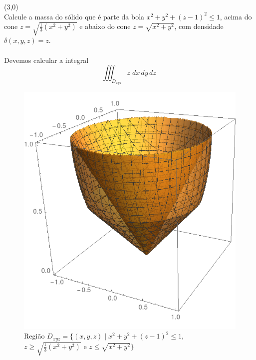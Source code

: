 \documentclass[12pt,a4paper]{article}
\begin{document}
\newpage

 (3,0) \\

Calcule a massa do sólido que é parte da bola $ x^2 + y^2 + (z-1)^2 \leq 1 $, acima do cone $ z = \displaystyle\sqrt{\frac{1}{3}(x^2 + y^2)}$ e abaixo do cone $z = \sqrt{x^2 + y^2}$, com densidade $\delta(x,y,z) = z$. \\

\\

Devemos calcular a integral
\begin{equation}
 \iiint_{D_{xyz}} z \;dx\,dy\,dz \
\label{eq:integralB}
\end{equation}

\begin{figure}[H]
	\centering
	\includegraphics[scale=0.3]{Fig3B.png}  
	\caption{Regi\~{a}o $ D_{xyz} = \lbrace(x, y, z)\mid x^2 + y^2 + (z-1)^2 \leq 1 $, $z \geq \sqrt{\frac{1}{3}(x^2 + y^2)} $ e $ z \leq \sqrt{x^2 + y^2} \rbrace $}
	\label{fig:figura3B}
\end{figure}
\end{document}
